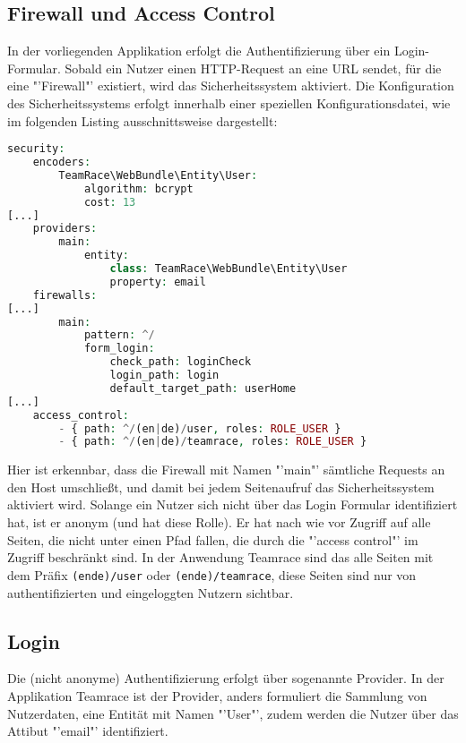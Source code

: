 \documentclass[12pt]{report}
\begin{document}
\subsection{Firewall und Access Control}

In der vorliegenden Applikation erfolgt die Authentifizierung über ein Login-Formular. Sobald ein Nutzer einen HTTP-Request an eine URL sendet, für die eine "'Firewall"' existiert, wird das Sicherheitssystem aktiviert. Die Konfiguration des Sicherheitssystems erfolgt innerhalb einer speziellen Konfigurationsdatei, wie im folgenden Listing ausschnittsweise dargestellt:

\begin{lstlisting}[language=php, caption=Auszug aus app/config/security.yml, showstringspaces=false]
security:
    encoders:
        TeamRace\WebBundle\Entity\User:
            algorithm: bcrypt
            cost: 13
[...]
    providers:
        main:
            entity:
                class: TeamRace\WebBundle\Entity\User
                property: email
    firewalls:
[...]
        main:
            pattern: ^/
            form_login:
                check_path: loginCheck
                login_path: login
                default_target_path: userHome
[...]
    access_control:
        - { path: ^/(en|de)/user, roles: ROLE_USER }
        - { path: ^/(en|de)/teamrace, roles: ROLE_USER }
\end{lstlisting}

Hier ist erkennbar, dass die Firewall mit Namen "'main"' sämtliche Requests an den Host umschließt, und damit bei jedem Seitenaufruf das Sicherheitssystem aktiviert wird. Solange ein Nutzer sich nicht über das Login Formular identifiziert hat, ist er anonym (und hat diese Rolle). Er hat nach wie vor Zugriff auf alle Seiten, die nicht unter einen Pfad fallen, die durch die "'access control"' im Zugriff beschränkt sind. In der Anwendung Teamrace sind das alle Seiten mit dem Präfix \texttt{(en\textbar de)/user} oder \texttt{(en\textbar de)/teamrace}, diese Seiten sind nur von authentifizierten und eingeloggten Nutzern sichtbar.

\subsection{Login}

Die (nicht anonyme) Authentifizierung erfolgt über sogenannte Provider. In der Applikation Teamrace ist der Provider, anders formuliert die Sammlung von Nutzerdaten, eine Entität mit Namen "'User"', zudem werden die Nutzer über das Attibut "'email"' identifiziert. 
\end{document}
